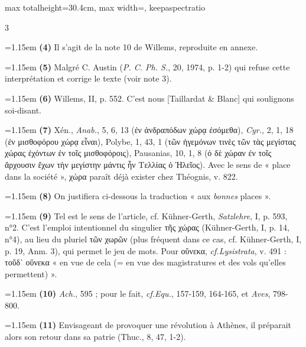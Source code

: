 \documentclass[11pt,twoside]{book}
\newcommand{\italique}[1]{\textit{#1}}
\newcommand{\cf}{\textit{cf.}\xspace}
\begin{document}
\begin{adjustbox}{max totalheight=30.4cm, max width=\textwidth, keepaspectratio}
\begin{minipage}{\textwidth}
{\begin{multicols}{3}
\par\vspace{1.5pt}
\noindent\hangindent=1.15em {\color{sepiaNote}\textbf{(4)}} Il s'agit de la note 10 de Willems, reproduite en annexe.
\par\vspace{1.5pt}
\noindent\hangindent=1.15em {\color{sepiaNote}\textbf{(5)}} Malgré C. Austin (\italique{P. C. Ph. S.}, 20, 1974, p. 1-2) qui refuse cette interprétation et corrige le texte (voir note 3).
\par\vspace{1.5pt}
\noindent\hangindent=1.15em {\color{sepiaNote}\textbf{(6)}} Willems, II, p. 552. C'est nous [Taillardat \& Blanc] qui soulignons soi-disant.
\par\vspace{1.5pt}
\noindent\hangindent=1.15em {\color{sepiaNote}\textbf{(7)}} Xén., \italique{Anab.}, 5, 6, 13 (ἐν ἀνδραπόδων χώρᾳ ἐσόμεθα), \italique{Cyr.}, 2, 1, 18 (ἐν μισθοφόρου χώρᾳ εἶναι), Polybe, 1, 43, 1 (τῶν ἡγεμόνων τινὲς τῶν τὰς μεγίστας χώρας ἐχόντων ἐν τοῖς μισθοφόροις), Pausanias, 10, 1, 8 (ὀ δὲ χώραν ἐν τοῖς ἄρχουσιν ἔχων τὴν μεγίστην μάντις ἦν Τελλίας ὁ Ἠλεῖος). Avec le sens de « place dans la société », χώρα paraît déjà exister chez Théognis, v. 822.
\par\vspace{1.5pt}
\noindent\hangindent=1.15em {\color{sepiaNote}\textbf{(8)}} On justifiera ci-dessous la traduction « aux \italique{bonnes} places ».
\par\vspace{1.5pt}
\noindent\hangindent=1.15em {\color{sepiaNote}\textbf{(9)}} Tel est le sens de l'article, cf. Kühner-Gerth, \italique{Satzlehre}, I, p. 593, n°2. C'est l'emploi intentionnel du singulier τῆς χώρας (Kühner-Gerth, I, p. 14, n°4), au lieu du pluriel τῶν χωρῶν (plus fréquent dans ce cas, cf. Kühner-Gerth, I, p. 19, Anm. 3), qui permet le jeu de mots. Pour οὕνεκα, \cf \italique{Lysistrata}, v. 491 : τοῦδ᾽ οὕνεκα « en vue de cela (= en vue des magistratures et des vols qu'elles permettent) ».
\par\vspace{1.5pt}
\noindent\hangindent=1.15em {\color{sepiaNote}\textbf{(10)}} \italique{Ach.}, 595 ; pour le fait, \cf \italique{Equ.}, 157-159, 164-165, et \italique{Aves}, 798-800.
\par\vspace{1.5pt}
\noindent\hangindent=1.15em {\color{sepiaNote}\textbf{(11)}} Envisageant de provoquer une révolution à Athènes, il préparait alors son retour dans sa patrie (Thuc., 8, 47, 1-2).

\end{multicols}}
\end{minipage}
\end{adjustbox}
\end{document}
